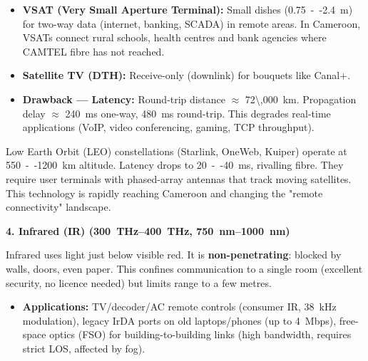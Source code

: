 \documentclass[11pt]{article}
\begin{document}
\begin{itemize}
\item \textbf{VSAT (Very Small Aperture Terminal):} Small dishes (\SI{0.75}{--}\SI{2.4}{m}) for two-way data (internet, banking, SCADA) in remote areas. In Cameroon, VSATs connect rural schools, health centres and bank agencies where CAMTEL fibre has not reached.
\item \textbf{Satellite TV (DTH):} Receive-only (downlink) for bouquets like Canal+.
\item \textbf{Drawback --- Latency:} Round-trip distance $\approx$ \SI{72\,000}{km}. Propagation delay $\approx$ \SI{240}{ms} one-way, \SI{480}{ms} round-trip. This degrades real-time applications (VoIP, video conferencing, gaming, TCP throughput).
\end{itemize}

\begin{savaistu}
Low Earth Orbit (LEO) constellations (Starlink, OneWeb, Kuiper) operate at \SI{550}{--}\SI{1200}{km} altitude. Latency drops to \SI{20}{--}\SI{40}{ms}, rivalling fibre. They require user terminals with phased-array antennas that track moving satellites. This technology is rapidly reaching Cameroon and changing the "remote connectivity" landscape.
\end{savaistu}

\textbf{4. Infrared (IR) (\SIrange{300}{400}{THz}, \SIrange{750}{1000}{nm})}\par
Infrared uses light just below visible red. It is \textbf{non-penetrating}: blocked by walls, doors, even paper. This confines communication to a single room (excellent security, no licence needed) but limits range to a few metres.

\begin{itemize}
\item \textbf{Applications:} TV/decoder/AC remote controls (consumer IR, \SI{38}{kHz} modulation), legacy IrDA ports on old laptops/phones (up to \SI{4}{Mbps}), free-space optics (FSO) for building-to-building links (high bandwidth, requires strict LOS, affected by fog).
\end{itemize}
\end{document}
